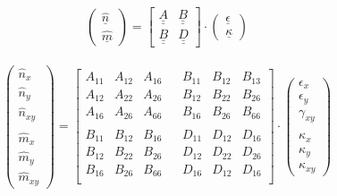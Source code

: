 \begin{equation}
	\begin{pmatrix}
	\hat{\underline{n}}\\
	\hat{\underline{m}}
	\end{pmatrix}
= \begin{bmatrix}
	\underline{\underline{A}}&\underline{\underline{B}}\\
	\underline{\underline{B}}&\underline{\underline{D}}
\end{bmatrix}
\cdot \begin{pmatrix}
	\underline{\epsilon}\\
	\underline{\kappa}
\end{pmatrix}
\end{equation}\\

\begin{equation}
\begin{pmatrix}
		\hat{n}_{x}\\
	\hat{n}_{y}\\
	\hat{n}_{xy}\\
	\\
	\hat{m}_{x}\\
	\hat{m}_{y}\\
	\hat{m}_{xy}
\end{pmatrix}
=\begin{bmatrix}
	A_{11}&A_{12}&A_{16}&&B_{11}&B_{12}&B_{13}\\
	A_{12}&A_{22}&A_{26}&&B_{12}&B_{22}&B_{26}\\
	A_{16}&A_{26}&A_{66}&&B_{16}&B_{26}&B_{66}\\
	\\
	B_{11}&B_{12}&B_{16}&&D_{11}&D_{12}&D_{16}\\
	B_{12}&B_{22}&B_{26}&&D_{12}&D_{22}&D_{26}\\
	B_{16}&B_{26}&B_{66}&&D_{16}&D_{12}&D_{16}\\
\end{bmatrix}
\cdot \begin{pmatrix}
	\epsilon_{x}\\
	\epsilon_{y}\\
	\gamma_{xy}\\
	\\
	\kappa_{x}\\
	\kappa_{y}\\
	\kappa_{xy}
\end{pmatrix}
\end{equation}

